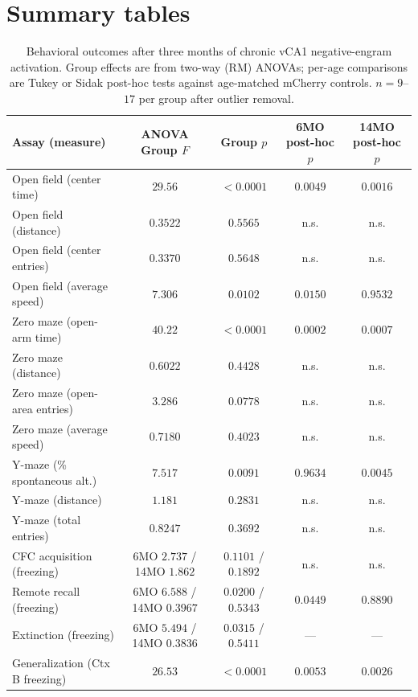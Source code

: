 \documentclass[11pt]{article}
\begin{document}
\section{Summary tables}

\begin{table}[htbp]
\centering
\caption{Behavioral outcomes after three months of chronic vCA1 negative-engram activation. Group effects are from two-way (RM) ANOVAs; per-age comparisons are Tukey or Sidak post-hoc tests against age-matched mCherry controls. $n=9$--$17$ per group after outlier removal.}
\label{tab:behavior}
\small
\begin{tabular}{lcccc}
\toprule
Assay (measure) & ANOVA Group $F$ & Group $p$ & 6MO post-hoc $p$ & 14MO post-hoc $p$ \\
\midrule
Open field (center time)        & $29.56$  & $<0.0001$ & $0.0049$  & $0.0016$ \\
Open field (distance)           & $0.3522$ & $0.5565$  & n.s.      & n.s.     \\
Open field (center entries)     & $0.3370$ & $0.5648$  & n.s.      & n.s.     \\
Open field (average speed)      & $7.306$  & $0.0102$  & $0.0150$  & $0.9532$ \\
Zero maze (open-arm time)       & $40.22$  & $<0.0001$ & $0.0002$  & $0.0007$ \\
Zero maze (distance)            & $0.6022$ & $0.4428$  & n.s.      & n.s.     \\
Zero maze (open-area entries)   & $3.286$  & $0.0778$  & n.s.      & n.s.     \\
Zero maze (average speed)       & $0.7180$ & $0.4023$  & n.s.      & n.s.     \\
Y-maze (\% spontaneous alt.)    & $7.517$  & $0.0091$  & $0.9634$  & $0.0045$ \\
Y-maze (distance)               & $1.181$  & $0.2831$  & n.s.      & n.s.     \\
Y-maze (total entries)          & $0.8247$ & $0.3692$  & n.s.      & n.s.     \\
CFC acquisition (freezing)      & 6MO $2.737$ / 14MO $1.862$ & $0.1101$ / $0.1892$ & n.s. & n.s. \\
Remote recall (freezing)        & 6MO $6.588$ / 14MO $0.3967$ & $0.0200$ / $0.5343$ & $0.0449$ & $0.8890$ \\
Extinction (freezing)           & 6MO $5.494$ / 14MO $0.3836$ & $0.0315$ / $0.5411$ & --- & --- \\
Generalization (Ctx B freezing) & $26.53$  & $<0.0001$ & $0.0053$  & $0.0026$ \\
\bottomrule
\end{tabular}
\end{table}
\end{document}
